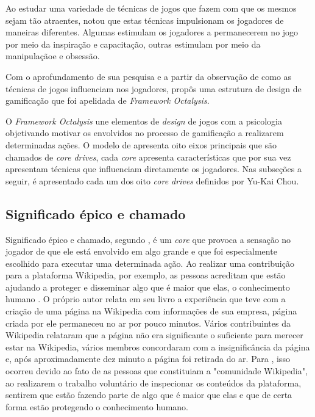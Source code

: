 Ao estudar uma variedade de técnicas de jogos que fazem com que os mesmos sejam tão atraentes,  notou que estas 
técnicas impulsionam os jogadores de maneiras diferentes. Algumas estimulam os jogadores a permanecerem no jogo por meio da
inspiração e capacitação, outras estimulam por meio da manipulaçãoe e obsessão.

Com o aprofundamento de sua pesquisa e a partir da observação de como as técnicas de jogos influenciam nos jogadores,  
propôs uma estrutura de design de gamificação que foi apelidada de  \textit{Framework Octalysis}.

O \textit{Framework Octalysis} une elementos de \textit{design} de jogos com a psicologia objetivando motivar os envolvidos
no processo de gamificação a realizarem determinadas ações. O modelo de  apresenta oito eixos principais que 
são chamados de \textit{core drives}, cada \textit{core} apresenta características que por sua vez apresentam técnicas que
influenciam diretamente os jogadores. Nas subseções a seguir, é apresentado cada um dos oito \textit{core drives}
definidos por Yu-Kai Chou.

\subsection{Significado épico e chamado}
Significado épico e chamado, segundo , é um \textit{core} que provoca a sensação no jogador de que ele está envolvido em algo 
grande e que foi especialmente escolhido para executar uma determinada ação. Ao realizar uma contribuição para a plataforma Wikipedia, por exemplo,
as pessoas acreditam que estão ajudando a proteger e disseminar algo que é maior que elas, o conhecimento humano \cite{chou2017actionable}. O próprio autor relata 
em seu livro a experiência que teve com a criação de uma página na Wikipedia com informações de sua empresa, página criada por ele permaneceu no ar por pouco minutos.
Vários contribuintes da Wikipedia relataram que a página não era significante o suficiente para merecer estar na Wikipedia, vários membros concordaram com
a insignificância da página e, após aproximadamente dez minuto a página foi retirada do ar. Para , isso 
ocorreu devido ao fato de as pessoas que constituiam a "comunidade Wikipedia", ao realizarem o trabalho voluntário de inspecionar os conteúdos da plataforma, sentirem
que estão fazendo parte de algo que é maior que elas e que de certa forma estão protegendo o conhecimento humano.

